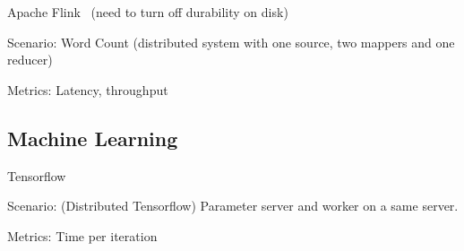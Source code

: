 Apache Flink~\cite{carbone2015apache} (need to turn off durability on disk)

Scenario: Word Count (distributed system with one source, two mappers and one reducer)

Metrics: Latency, throughput

\subsection{Machine Learning}

Tensorflow~\cite{abadi2016tensorflow}

Scenario: (Distributed Tensorflow) Parameter server and worker on a same server.

Metrics: Time per iteration